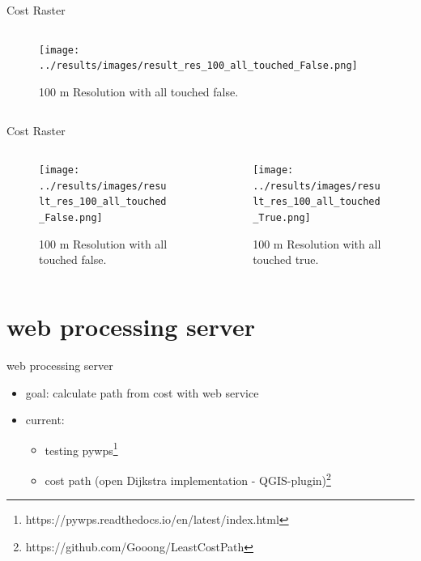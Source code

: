 \documentclass[usenames,dvipsnames,aspectratio=169]{beamer}
\begin{document}
\begin{frame}{Cost Raster}
	\begin{columns}[T] %
		\begin{column}{.48\textwidth}
			\begin{figure}[htb]
				\texttt{[image: ../results/images/result\_res\_100\_all\_touched\_False.png]}
				\caption{100 m Resolution with all touched false.}
			\end{figure}
		\end{column}
		\begin{column}{.48\textwidth}
			
		\end{column}
	\end{columns}
\end{frame}

\begin{frame}{Cost Raster}
	\begin{columns}[T] %
		\begin{column}{.48\textwidth}
			\begin{figure}[htb]
				\texttt{[image: ../results/images/result\_res\_100\_all\_touched\_False.png]}
				\caption{100 m Resolution with all touched false.}
			\end{figure}
		\end{column}
		\begin{column}{.48\textwidth}
			\begin{figure}[htb]
				\texttt{[image: ../results/images/result\_res\_100\_all\_touched\_True.png]}
				\caption{100 m Resolution with all touched true.}
			\end{figure}
		\end{column}
	\end{columns}
\end{frame}

\section{web processing server}
\begin{frame}{web processing server}
	\begin{itemize}
		\item goal: calculate path from cost with web service
		\item current: 
		\begin{itemize}
			\item testing pywps\footnote{https://pywps.readthedocs.io/en/latest/index.html}
			\item cost path (open Dijkstra implementation - QGIS-plugin)\footnote{https://github.com/Gooong/LeastCostPath}
		\end{itemize}
	\end{itemize}
\end{frame}
\end{document}
